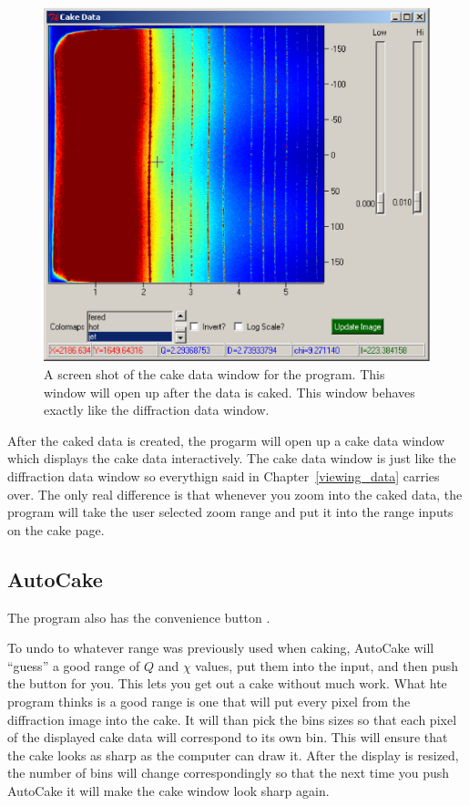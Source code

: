 \begin{figure}
\centering
\includegraphics[scale=.75]{figures/cake_data_window.eps}
\caption{A screen shot of the cake data window for
    the program. This window will open up after the
    data is caked. This window behaves exactly like 
    the diffraction data window.} 
\label{cake_data_window}
\end{figure}
After the caked data is created, the progarm will open up a cake data
window which displays the cake data interactively.
The cake data window is just like the diffraction
data window so everythign said in Chapter~\ref{viewing_data} 
carries over. The only real difference is that whenever
you zoom into the caked data, the program will take the user
selected zoom range and put it into the range inputs on
the cake page.

\subsection{AutoCake}

The program also has the convenience button .

To undo to whatever range was previously used when caking, 
AutoCake will ``guess'' a good range of $Q$ and $\chi$ 
values, put them into the input, and then push the 
 button for you. This lets you get out a 
cake without much work. What hte program thinks is a
good range is one that will put every pixel from the 
diffraction image into the cake. It will than pick
the bins sizes so that each pixel of the displayed 
cake data will correspond to its own bin. This will ensure
that the cake looks as sharp as the computer can draw it.
After the display is resized, the number of bins will
change correspondingly so that the next time you push
AutoCake it will make the cake window look sharp again.

